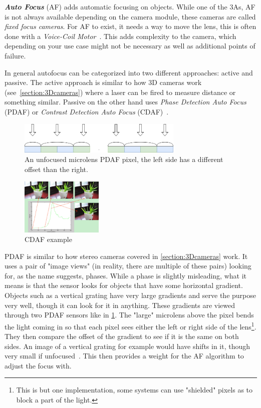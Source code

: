 \textit{\textbf{Auto Focus}} (AF)  adds automatic focusing on objects. While
one of the 3As, AF is not always available depending on the camera module, these
cameras are called \textit{fixed focus cameras}. For AF to exist, it needs a way to move
the lens, this is often done with a \textit{Voice-Coil Motor}~\cite{coilmotor2007}.
This adds complexity to the camera, which depending on your use case might not be
necessary as well as additional points of failure.

In general autofocus can be categorized into two different approaches: active
and passive. The active approach is similar to how 3D cameras work
(see~\cref{section:3Dcameras}) where a laser can be fired to measure distance
or something similar. Passive on the other hand uses \textit{Phase Detection
Auto Focus} (PDAF) or \textit{Contrast Detection Auto Focus} (CDAF)~\cite{Abuolaim_2018_ECCV}.

\begin{figure}
    \centering
        \includegraphics[width=0.7\textwidth]{figures/pdaf_sensor.png}
        \caption{An unfocused microlens PDAF pixel, the left side has a
        different offset than the right.}
        \label{fig:pdaf}
\end{figure}

\pagebreak
\begin{figure}
    \begin{center}
        \includegraphics[width=0.35\textwidth]{figures/cdaf.png}
    \end{center}
    \caption{CDAF example~\cite{xu2011robust}}\label{fig:cdaf}
\end{figure}
PDAF is similar to how stereo cameras covered in \cref{section:3Dcameras}
work. It uses a pair of "image views" (in reality, there are multiple of these pairs)
looking for, as the name suggests, phases. While a phase is slightly
misleading, what it means is that the sensor looks for objects that have some
horizontal gradient. Objects such as a vertical grating have very large
gradients and serve the purpose very well, though it can look for it in
anything. These gradients are viewed through two PDAF sensors like in
\cref{fig:pdaf}. The "large" microlens above the pixel bends the light coming
in so that each pixel sees either the left or right side of the
lens\footnote{This is but one implementation, some systems can use "shielded"
pixels as to block a part of the light.}. They then compare the offset of the
gradient to see if it is the same on both sides. An image of a vertical
grating for example would have shifts in it, though very small if unfocused~\cite{pdafPatent}.
This then provides a weight for the AF algorithm to adjust the focus with.


